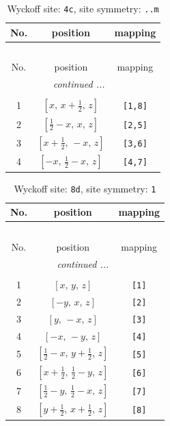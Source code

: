 \documentclass[fleqn,8pt]{jsarticle}
\begin{document}
\begin{longtable}{ccc}
\caption{Wyckoff site: {\tt 4c}, site symmetry: {\tt ..m}}
 \\
 \hline \hline
No. & position & mapping \\ \hline \endfirsthead

\multicolumn{2}{l}{\tablename\ \thetable{}} \\
 \hline \hline
No. & position & mapping \\ \hline \endhead

 \hline \hline
\multicolumn{2}{r}{\footnotesize\it continued ...} \\ \endfoot

 \hline \hline
\multicolumn{2}{r}{} \\ \endlastfoot

1 & $\left[ x,\, x + \frac{1}{2},\, z \right]$ & {\tt [1,8]} \\ \hline
2 & $\left[ \frac{1}{2} - x,\, x,\, z \right]$ & {\tt [2,5]} \\ \hline
3 & $\left[ x + \frac{1}{2},\, - x,\, z \right]$ & {\tt [3,6]} \\ \hline
4 & $\left[ - x,\, \frac{1}{2} - x,\, z \right]$ & {\tt [4,7]} \\
\end{longtable}
\renewcommand{\arraystretch}{1.2}
\begin{longtable}{ccc}
\caption{Wyckoff site: {\tt 8d}, site symmetry: {\tt 1}}
 \\
 \hline \hline
No. & position & mapping \\ \hline \endfirsthead

\multicolumn{2}{l}{\tablename\ \thetable{}} \\
 \hline \hline
No. & position & mapping \\ \hline \endhead

 \hline \hline
\multicolumn{2}{r}{\footnotesize\it continued ...} \\ \endfoot

 \hline \hline
\multicolumn{2}{r}{} \\ \endlastfoot

1 & $\left[ x,\, y,\, z \right]$ & {\tt [1]} \\ \hline
2 & $\left[ - y,\, x,\, z \right]$ & {\tt [2]} \\ \hline
3 & $\left[ y,\, - x,\, z \right]$ & {\tt [3]} \\ \hline
4 & $\left[ - x,\, - y,\, z \right]$ & {\tt [4]} \\ \hline
5 & $\left[ \frac{1}{2} - x,\, y + \frac{1}{2},\, z \right]$ & {\tt [5]} \\ \hline
6 & $\left[ x + \frac{1}{2},\, \frac{1}{2} - y,\, z \right]$ & {\tt [6]} \\ \hline
7 & $\left[ \frac{1}{2} - y,\, \frac{1}{2} - x,\, z \right]$ & {\tt [7]} \\ \hline
8 & $\left[ y + \frac{1}{2},\, x + \frac{1}{2},\, z \right]$ & {\tt [8]} \\
\end{longtable}
\end{document}
